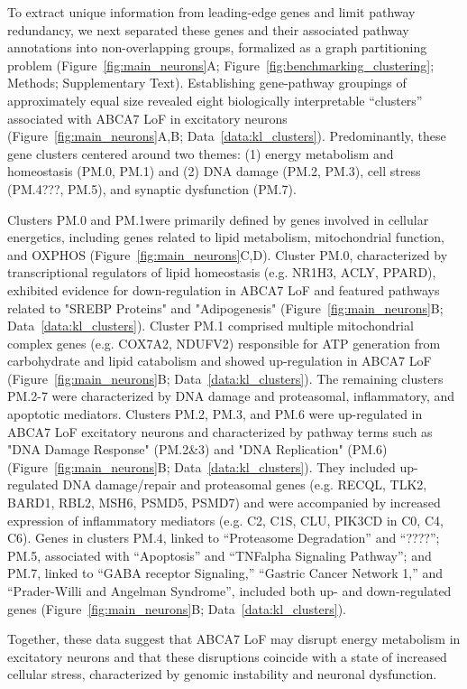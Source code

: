 To extract unique information from leading-edge genes and limit pathway redundancy, we next separated these genes and their associated pathway annotations into non-overlapping groups, formalized as a graph partitioning problem (Figure~\ref{fig:main_neurons}A; Figure~\ref{fig:benchmarking_clustering}; Methods; Supplementary Text). Establishing gene-pathway groupings of approximately equal size revealed eight biologically interpretable “clusters” associated with ABCA7 LoF in excitatory neurons (Figure~\ref{fig:main_neurons}A,B; Data~\ref{data:kl_clusters}). Predominantly, these gene clusters centered around two themes: (1) energy metabolism and homeostasis (PM.0, PM.1) and (2) DNA damage (PM.2, PM.3), cell stress (PM.4???, PM.5), and synaptic dysfunction (PM.7).

Clusters PM.0 and PM.1were primarily defined by genes involved in cellular energetics, including genes related to lipid metabolism, mitochondrial function, and OXPHOS (Figure~\ref{fig:main_neurons}C,D). Cluster PM.0, characterized by transcriptional regulators of lipid homeostasis (e.g. NR1H3, ACLY, PPARD), exhibited evidence for down-regulation in ABCA7 LoF and featured pathways related to "SREBP Proteins" and "Adipogenesis" (Figure~\ref{fig:main_neurons}B; Data~\ref{data:kl_clusters}). Cluster PM.1 comprised multiple mitochondrial complex genes (e.g. COX7A2, NDUFV2) responsible for ATP generation from carbohydrate and lipid catabolism and showed up-regulation in ABCA7 LoF (Figure~\ref{fig:main_neurons}B; Data~\ref{data:kl_clusters}). The remaining clusters PM.2-7 were characterized by DNA damage and proteasomal, inflammatory, and apoptotic mediators. Clusters PM.2, PM.3, and PM.6 were up-regulated in ABCA7 LoF excitatory neurons and characterized by pathway terms such as "DNA Damage Response" (PM.2&3) and "DNA Replication" (PM.6) (Figure~\ref{fig:main_neurons}B; Data~\ref{data:kl_clusters}). They included up-regulated DNA damage/repair and proteasomal genes (e.g. RECQL, TLK2, BARD1, RBL2, MSH6, PSMD5, PSMD7) and were accompanied by increased expression of inflammatory mediators (e.g. C2, C1S, CLU, PIK3CD in C0, C4, C6). Genes in clusters PM.4, linked to “Proteasome Degradation” and “????”; PM.5, associated with “Apoptosis” and “TNFalpha Signaling Pathway”; and PM.7, linked to “GABA receptor Signaling,” “Gastric Cancer Network 1,” and “Prader-Willi and Angelman Syndrome”,  included both up- and down-regulated genes (Figure~\ref{fig:main_neurons}B; Data~\ref{data:kl_clusters}).

Together, these data suggest that ABCA7 LoF may disrupt energy metabolism in excitatory neurons and that these disruptions coincide with a state of increased cellular stress, characterized by genomic instability and neuronal dysfunction.

